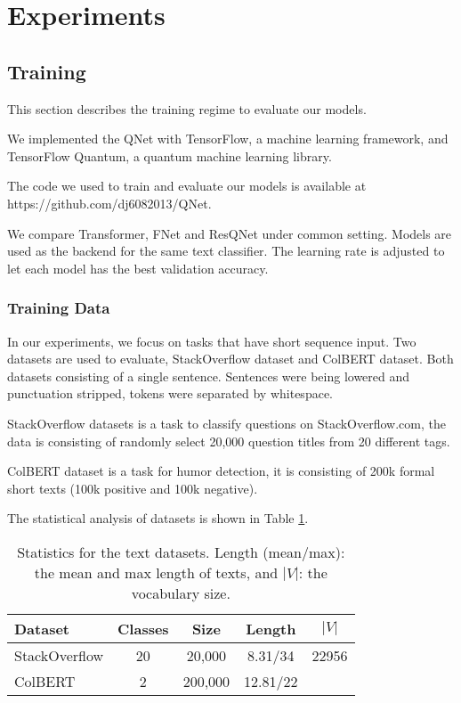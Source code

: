 \section{Experiments}

\subsection{Training}

This section describes the training regime to evaluate our models.

We implemented the QNet with TensorFlow, a machine learning framework, and TensorFlow Quantum, a  quantum machine learning library.

The code we used to train and evaluate our models is available at https://github.com/dj6082013/QNet.

We compare Transformer, FNet and ResQNet under common setting. Models are used as the backend for the same text classifier. The learning rate is adjusted to let each model has the best validation accuracy.

\subsubsection{Training Data}

In our experiments, we focus on tasks that have short sequence input. Two datasets are used to evaluate, StackOverflow dataset and ColBERT dataset. Both datasets consisting of a single sentence. Sentences were being lowered and punctuation stripped, tokens were separated by whitespace.

StackOverflow datasets is a task to classify questions on StackOverflow.com, the data is consisting of randomly select 20,000 question titles from 20 different tags.

ColBERT dataset is a task for humor detection, it is consisting of 200k formal short texts (100k positive and 100k negative).

The statistical analysis of datasets is shown in Table \ref{table:dataset-statistic}.

\begin{table}[htb!]
    \centering
    \begin{tabular}{ l|c|c|c|c  }
        \hline
        Dataset & Classes & Size & Length & $|V|$ \\
        \hline
        StackOverflow & 20 & 20,000 & 8.31/34 & 22956 \\
        ColBERT & 2 & 200,000 & 12.81/22 & \\
        \hline
    \end{tabular}
    \caption{Statistics for the text datasets. Length (mean/max): the mean and max length of texts, and $|V|$: the vocabulary size.}
    \label{table:dataset-statistic}
\end{table}

